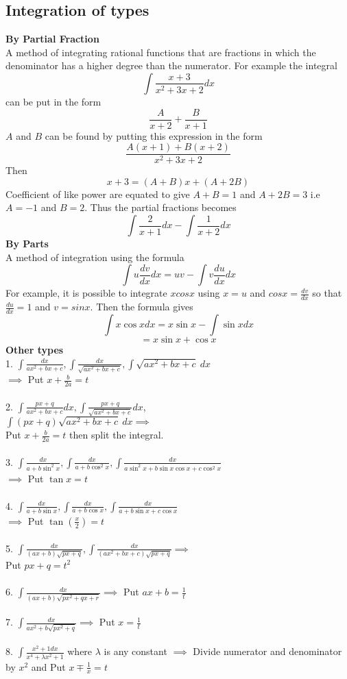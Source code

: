 \documentclass[12pt]{article}
\begin{document}
\subsection{Integration of types}
\textbf{By Partial Fraction} \\
A method of integrating rational functions that are fractions in which the denominator has a higher degree than the numerator. For example
the integral $$\int \frac{x+3}{x^2+3x+2}dx$$
can be put in the form $$\frac{A}{x+2} +\frac{B}{x+1}$$
$A$ and $B$ can be found by putting this expression in the form $$\frac{A(x+1)+B(x+2)}{x^2+3x+2}$$ Then $$x+3=(A+B)x+(A+2B)$$ Coefficient of like power are equated to give $A+B=1$ and $A+2B=3$ i.e $A=-1$ and $B=2$. Thus the partial fractions becomes $$\int \frac{2}{x+1}dx - \int \frac{1}{x+2}dx$$
\textbf{By Parts} \\
A method of integration using the formula $$\int u \frac{dv}{dx}dx=uv-\int v \frac{du}{dx}dx$$ For example, it is possible to integrate $xcosx$ using $x=u$ and $cosx = \frac{dv}{dx}$ so that $\frac{du}{dx}=1$
and $v=sinx.$ Then the formula gives $$\int x\cos xdx=x\sin x- \int \sin xdx$$ $$=x\sin x+\cos x$$
\textbf{Other types}\\
1. $\int \frac{dx}{ax^2+bx+c},\int \frac{dx}{\sqrt{ax^2+bx+c}},\int \sqrt{ax^2+bx+c} \medspace dx$\\ $\implies$ Put $x+\frac{b}{2a}=t$\\ \\
2. $\int \frac{px+q}{ax^2+bx+c}dx,\int \frac{px+q}{\sqrt{ax^2+bx+c}}dx$,\\$\int(px+q)\sqrt{ax^2+bx+c} \medspace dx \implies$ \\
Put $x+\frac{b}{2a}=t$ then split the integral. \\ \\
3. $\int \frac{dx}{a+b\sin^2x}, \int \frac{dx}{a+b\cos^2x},\int \frac{dx}{a\sin^2x+b\sin x \cos x+c\cos^2x}$ \\
$\implies$ Put $\tan x=t$ \\ \\
4. $\int \frac{dx}{a+b \sin x}, \int \frac{dx}{a+b \cos x},\int \frac{dx}{a+b \sin x+c\cos x}$ \\
$\implies$ Put $\tan(\frac{x}{2})=t$ \\ \\
5. $\int \frac{dx}{(ax+b)\sqrt{px+q}},\int \frac{dx}{(ax^2+bx+c)\sqrt{px+q}} \implies$ \\
Put $px+q=t^2$ \\\\
6. $\int \frac{dx}{(ax+b)\sqrt{px^2+qx+r}} \implies$ Put $ax+b=\frac{1}{t}$ \\\\
7. $\int \frac{dx}{ax^2+b\sqrt{px^2+q}} \implies$ Put $x=\frac{1}{t}$ \\\\
8. $\int \frac{x^2+1dx}{x^4+\lambda x^2+1}$ where $\lambda$ is any constant $\implies$ Divide numerator and denominator by $x^2$ and Put $x \mp \frac{1}{x}=t$
\end{document}
